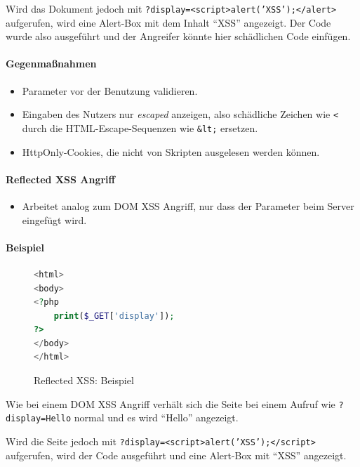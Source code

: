 \documentclass[a4paper, 11pt, accentcolor = tud3b]{tudreport}
\begin{document}
							Wird das Dokument jedoch mit \texttt{?display=<script>alert('XSS');</alert>} aufgerufen, wird eine Alert-Box mit dem Inhalt \enquote{XSS} angezeigt. Der Code wurde also ausgeführt und der Angreifer könnte hier schädlichen Code einfügen.
						
						\paragraph{Gegenmaßnahmen}
							\begin{itemize}
								\item Parameter vor der Benutzung validieren.
								\item Eingaben des Nutzers nur \textit{escaped} anzeigen, also schädliche Zeichen wie \texttt{<} durch die HTML-Escape-Sequenzen wie \texttt{\&lt;} ersetzen.
								\item HttpOnly-Cookies, die nicht von Skripten ausgelesen werden können.
							\end{itemize}
					
					\paragraph{Reflected XSS Angriff}
						\begin{itemize}
							\item Arbeitet analog zum DOM XSS Angriff, nur dass der Parameter beim Server eingefügt wird.
						\end{itemize}
					
						\paragraph{Beispiel}
							\begin{figure}[H]
								\centering
								\begin{lstlisting}[language = PHP]
<html>
<body>
<?php
	print($_GET['display']);
?>
</body>
</html>
\end{lstlisting}
								\caption{Reflected XSS: Beispiel}
							\end{figure}
							Wie bei einem DOM XSS Angriff verhält sich die Seite bei einem Aufruf wie \texttt{?display=Hello} normal und es wird \enquote{Hello} angezeigt.
							
							Wird die Seite jedoch mit \texttt{?display=<script>alert('XSS');</script>} aufgerufen, wird der Code ausgeführt und eine Alert-Box mit \enquote{XSS} angezeigt.
						
\end{document}
